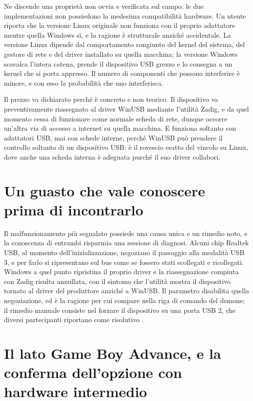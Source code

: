 Ne discende una proprietà non ovvia e verificata sul campo: le due implementazioni non possiedono la medesima compatibilità hardware. Un utente riporta che la versione Linux originale non funziona con il proprio adattatore mentre quella Windows sì, e la ragione è strutturale anziché accidentale. La versione Linux dipende dal comportamento congiunto del kernel del sistema, del gestore di rete e del driver installato su quella macchina; la versione Windows scavalca l'intera catena, prende il dispositivo USB grezzo e lo consegna a un kernel che si porta appresso. Il numero di componenti che possono interferire è minore, e con esso la probabilità che uno interferisca.

Il prezzo va dichiarato perché è concreto e non teorico. Il dispositivo va preventivamente riassegnato al driver WinUSB mediante l'utilità Zadig, e da quel momento cessa di funzionare come normale scheda di rete, dunque occorre un'altra via di accesso a internet su quella macchina. E funziona soltanto con adattatori USB, mai con schede interne, perché WinUSB può prendere il controllo soltanto di un dispositivo USB: è il rovescio esatto del vincolo su Linux, dove anche una scheda interna è adeguata purché il suo driver collabori.

\section{Un guasto che vale conoscere prima di incontrarlo}

Il malfunzionamento più segnalato possiede una causa unica e un rimedio noto, e la conoscenza di entrambi risparmia una sessione di diagnosi. Alcuni chip Realtek USB, al momento dell'inizializzazione, negoziano il passaggio alla modalità USB 3, e per farlo si ripresentano sul bus come se fossero stati scollegati e ricollegati. Windows a quel punto ripristina il proprio driver e la riassegnazione compiuta con Zadig risulta annullata, con il sintomo che l'utilità mostra il dispositivo tornato al driver del produttore anziché a WinUSB. Il parametro  disabilita quella negoziazione, ed è la ragione per cui compare nella riga di comando del demone; il rimedio manuale consiste nel forzare il dispositivo su una porta USB 2, che diversi partecipanti riportano come risolutivo \cite{pmr-discord}.

\section{Il lato Game Boy Advance, e la conferma dell'opzione con hardware intermedio}

